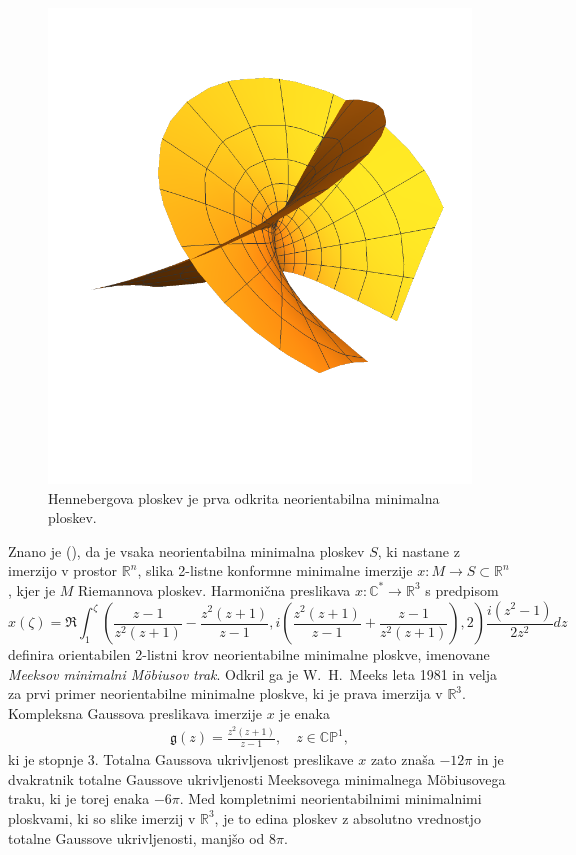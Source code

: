 \documentclass[12pt,a4paper,twoside]{article}
\theoremstyle{definition} %
\theoremstyle{plain} %
\numberwithin{equation}{section}  %
\newcommand{\R}{\mathbb R}
\newcommand{\C}{\mathbb C}
\begin{document}
\begin{figure}[h!]
\begin{center}
\includegraphics[scale=0.8]{images/henneberg.pdf}
\caption{Hennebergova ploskev je prva odkrita neorientabilna minimalna ploskev.}
\end{center}
\end{figure}

Znano je (\cite[Section~2.4]{alarcon2021minimal}), da je vsaka neorientabilna minimalna ploskev $S$, ki nastane z imerzijo v prostor $\R^{n}$, slika 2-listne konformne minimalne imerzije $x \colon M \to S \subset \R^{n}$, kjer je $M$ Riemannova ploskev.
Harmonična preslikava $x \colon \C^{*} \to \R^{3}$ s predpisom
\begin{equation*}
x(\zeta) = \Re \int_{1}^{\zeta} \left( \frac{z-1}{z^2(z+1)} - \frac{z^2(z+1)}{z-1}, i \left( \frac{z^2(z+1)}{z-1} + \frac{z-1}{z^2(z+1)} \right), 2 \right) \frac{i(z^2-1)}{2z^2} dz
\end{equation*}
definira orientabilen 2-listni krov neorientabilne minimalne ploskve, imenovane \emph{Meeksov minimalni M\"obiusov trak}. Odkril ga je W.~H.~Meeks leta 1981 in velja za prvi primer neorientabilne minimalne ploskve, ki je prava imerzija v $\R^{3}$. \newline
Kompleksna Gaussova preslikava imerzije $x$ je enaka
\begin{gather*}
\mathfrak{g}(z) = \frac{z^2(z+1)}{z-1}, \quad z \in \mathbb{CP}^1,
\end{gather*}
ki je stopnje $3$. Totalna Gaussova ukrivljenost preslikave $x$ zato znaša $-12 \pi$ in je dvakratnik totalne Gaussove ukrivljenosti Meeksovega minimalnega M\"obiusovega traku, ki je torej enaka $-6 \pi$.
Med kompletnimi neorientabilnimi minimalnimi ploskvami, ki so slike imerzij v $\R^3$, je to edina ploskev z absolutno vrednostjo totalne Gaussove ukrivljenosti, manjšo od $8 \pi$.
\end{document}
